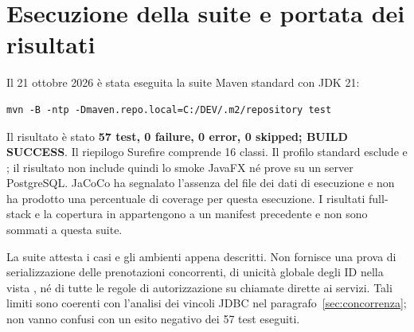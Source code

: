 \section{Esecuzione della suite e portata dei risultati}
Il 21 ottobre 2026 è stata eseguita la suite Maven standard con JDK 21:
\begin{lstlisting}
mvn -B -ntp -Dmaven.repo.local=C:/DEV/.m2/repository test
\end{lstlisting}
Il risultato è stato \textbf{57 test, 0 failure, 0 error, 0 skipped; BUILD SUCCESS}. Il riepilogo Surefire comprende 16 classi. Il profilo standard esclude  e ; il risultato non include quindi lo smoke JavaFX né prove su un server PostgreSQL. JaCoCo ha segnalato l'assenza del file dei dati di esecuzione e non ha prodotto una percentuale di coverage per questa esecuzione. I risultati full-stack e la copertura in  appartengono a un manifest precedente e non sono sommati a questa suite.

La suite attesta i casi e gli ambienti appena descritti. Non fornisce una prova di serializzazione delle prenotazioni concorrenti, di unicità globale degli ID nella vista , né di tutte le regole di autorizzazione su chiamate dirette ai servizi. Tali limiti sono coerenti con l'analisi dei vincoli JDBC nel paragrafo~\ref{sec:concorrenza}; non vanno confusi con un esito negativo dei 57 test eseguiti.
